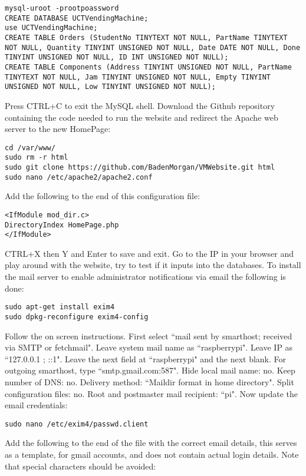 \documentclass[a4paper,11pt]{article}
\numberwithin{figure}{section}
\numberwithin{table}{section}
\begin{document}
\begin{appendices}
\begin{lstlisting}[firstnumber=11]
mysql-uroot -prootpoassword
CREATE DATABASE UCTVendingMachine;
use UCTVendingMachine;
CREATE TABLE Orders (StudentNo TINYTEXT NOT NULL, PartName TINYTEXT NOT NULL, Quantity TINYINT UNSIGNED NOT NULL, Date DATE NOT NULL, Done TINYINT UNSIGNED NOT NULL, ID INT UNSIGNED NOT NULL);
CREATE TABLE Components (Address TINYINT UNSIGNED NOT NULL, PartName TINYTEXT NOT NULL, Jam TINYINT UNSIGNED NOT NULL, Empty TINYINT UNSIGNED NOT NULL, Low TINYINT UNSIGNED NOT NULL);
\end{lstlisting}
Press CTRL+C to exit the MySQL shell. Download the Github repository containing the code needed to run the website and redirect the Apache web server to the new HomePage:
\begin{lstlisting}[firstnumber=16]
cd /var/www/
sudo rm -r html
sudo git clone https://github.com/BadenMorgan/VMWebsite.git html
sudo nano /etc/apache2/apache2.conf
\end{lstlisting}
Add the following to the end of this configuration file:
\begin{lstlisting}[firstnumber=20]
<IfModule mod_dir.c>
DirectoryIndex HomePage.php
</IfModule>
\end{lstlisting}
CTRL+X then Y and Enter to save and exit. Go to the IP in your browser and play around with the website, try to test if it inputs into the databases. To install the mail server to enable administrator notifications via email the following is done:
\begin{lstlisting}[firstnumber=23]
sudo apt-get install exim4
sudo dpkg-reconfigure exim4-config
\end{lstlisting}
Follow the on screen instructions. First select ``mail sent by smarthost; received via SMTP or fetchmail". Leave system mail name as ``raspberrypi". Leave IP as ``127.0.0.1 ; ::1". Leave the next field at ``raspberrypi" and the next blank. For outgoing smarthost, type ``smtp.gmail.com:587". Hide local mail name: no. Keep number of DNS: no. Delivery method: ``Maildir format in home directory". Split configuration files: no. Root and postmaster mail recipient: ``pi". Now update the email credentials:
\begin{lstlisting}[firstnumber=25]
sudo nano /etc/exim4/passwd.client
\end{lstlisting}
Add the following to the end of the file with the correct email details, this serves as a template, for gmail accounts, and does not contain actual login details. Note that special characters should be avoided:

\end{appendices}
\end{document}
